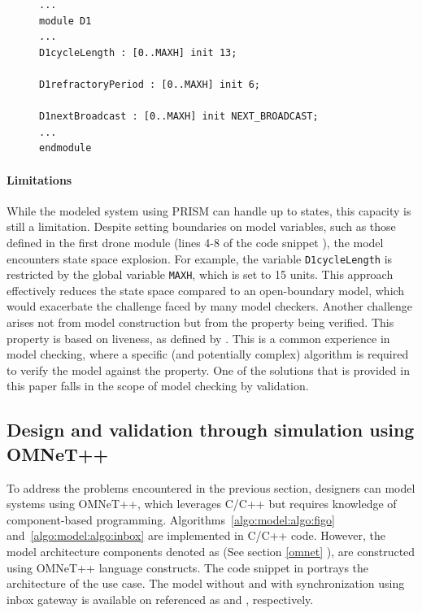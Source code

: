 \begin{figure}[!htb]            
\begin{minipage}{16.5cm}
\begin{lstlisting}[style=framed,%customc,
	caption=PRISM Code for Clock Drift Observation,
 	label=modelparameters]	
...
module D1
...
D1cycleLength : [0..MAXH] init 13;

D1refractoryPeriod : [0..MAXH] init 6;

D1nextBroadcast : [0..MAXH] init NEXT_BROADCAST;
...
endmodule
\end{lstlisting}
 \end{minipage}  
\end{figure}

\paragraph{Limitations} While the modeled system using PRISM can handle up to  states, this capacity is still a limitation. Despite setting boundaries on model variables, such as those defined in the first drone module (lines 4-8 of the code snippet ), the model encounters state space explosion. For example, the variable \texttt{D1cycleLength} is restricted by the global variable \texttt{MAXH}, which is set to 15 units. This approach effectively reduces the state space compared to an open-boundary model, which would exacerbate the challenge faced by many model checkers. Another challenge arises not from model construction but from the property being verified. This property is based on liveness, as defined by \citeauthor{alur2015} \cite{alur2015}. This is a common experience in model checking, where a specific (and potentially complex) algorithm is required to verify the model against the property. One of the solutions that is provided in this paper falls in the scope of model checking by validation.









\subsection{Design and validation through simulation using OMNeT++}
To address the problems encountered in the previous section, designers can model systems using OMNeT++, which leverages C/C++ but requires knowledge of component-based programming. Algorithms~\ref{algo:model:algo:figo} and~\ref{algo:model:algo:inbox} are implemented in C/C++ code. However, the model architecture components denoted as  (See section \ref{omnet} ), are constructed using OMNeT++ language constructs. The code snippet in  portrays the architecture of the use case. The model without and with synchronization using inbox gateway is available on \cite{csi2023} referenced as  and , respectively.

